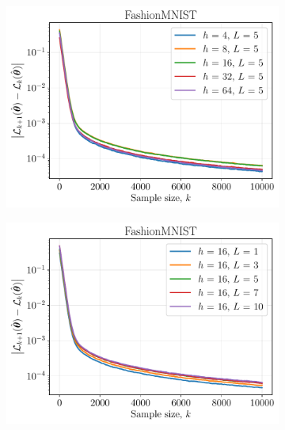 \documentclass{article}
\begin{document}
\begin{figure}[ht] 
  \begin{subfigure}[b]{0.5\linewidth}
    \centering
    \includegraphics[width=\linewidth]{figs/fashion_mnist_hidden_size.pdf} 
  \end{subfigure}%
  \begin{subfigure}[b]{0.5\linewidth}
    \centering
    \includegraphics[width=\linewidth]{figs/fashion_mnist_num_layers.pdf} 
  \end{subfigure} 
  \begin{subfigure}[b]{0.5\linewidth}
    \centering

\end{subfigure}
\end{figure}
\end{document}
